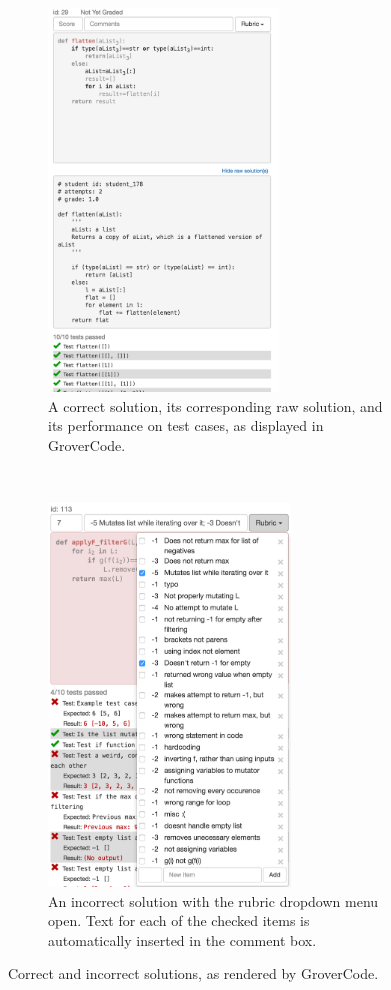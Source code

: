 \documentclass[12pt,twoside]{mitthesis}
\begin{document}
\begin{figure}[t!]
    \centering
    \begin{subfigure}[b]{0.5\textwidth}
        \centering
        \includegraphics[height=4in]{Body/figures/grovercode/figure_2}
        \caption{A correct solution, its corresponding raw solution, and its performance on test cases, as displayed in GroverCode.}
        \label{fig:correct_stack}
    \end{subfigure}%
    ~ 
    \begin{subfigure}[b]{0.5\textwidth}
        \centering
        \includegraphics[height=4in]{Body/figures/grovercode/figure_3}
        \caption{An incorrect solution with the rubric dropdown menu open. Text for each of the checked items is automatically inserted in the comment box.}
        \label{fig:rubric}
    \end{subfigure}
    \caption{Correct and incorrect solutions, as rendered by GroverCode.}
\label{fig:correct_and_incorrect_stacks}
\end{figure}
\end{document}
